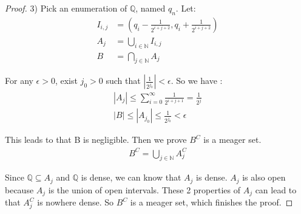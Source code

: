 \documentclass[a4paper, linespread=1.5]{article}
\begin{document}
\begin{proof}
		3)
		Pick an enumeration of $\mathbb{Q}$, named $q_n$. Let:
		\begin{align*}
			I_{i,j}&=(q_i-\frac{1}{2^{i+j+2}},q_i+\frac{1}{2^{i+j+2}})\\
			A_j&=\bigcup\limits_{i\in \mathbb{N}}I_{i,j}\\
			B&=\bigcap\limits_{j\in\mathbb{N}}A_j
		\end{align*}
		
		For any $\epsilon>0$, exist $j_0>0$ such that $|\frac{1}{2^{j_0}}|<\epsilon$. So we have :
		\begin{align*}
			|A_j|\le \sum_{i=0}^{\infty} \frac{1}{2^{i+j+1}}=\frac{1}{2^j} \\
			|B|\le|A_{j_0}|\le \frac{1}{2^{j_0}} < \epsilon
		\end{align*}
		
		This leads to that B is negligible. Then we prove $B^C$ is a meager set.
		\begin{align*}
			B^C=\bigcup\limits_{j\in\mathbb{N}}A_j^C
		\end{align*}
		
		Since $\mathbb{Q}\subseteq A_j$ and $\mathbb{Q}$ is dense, we can know that $A_j$ is dense. $A_j$ is also open because $A_j$ is the union of open intervals. These 2 properties of $A_j$ can lead to that $A_j^C$ is nowhere dense. So $B^C$ is a meager set, which finishes the proof.
	\end{proof}
	
	
    
    
\end{document}
